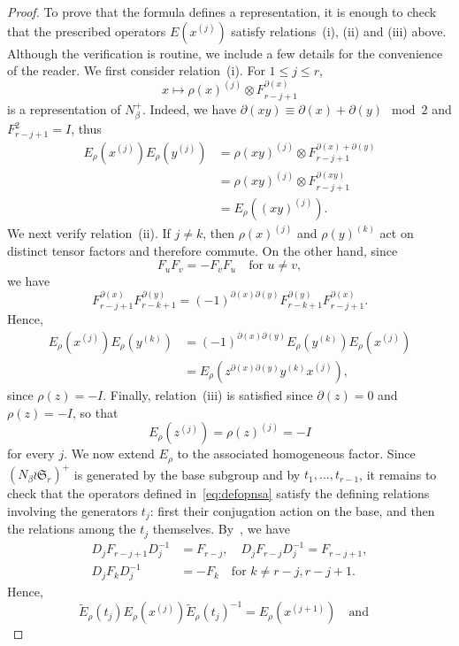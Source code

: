 \documentclass[reqno]{amsart}
\newcommand{\sym}{\mathfrak{S}}
\theoremstyle{definition}
\begin{document}
\begin{proof}
To prove that the formula defines a representation, it is enough to check that
the prescribed operators $E(x^{(j)})$ satisfy relations~(i), (ii) and
(iii) above. Although the verification is routine, we include a few
details for the convenience of the reader. 
We first consider relation~(i). For $1\leq j\leq r$, 
\[
x\longmapsto
\rho(x)^{(j)}\otimes F_{r-j+1}^{\partial(x)}
\]
is a representation of $N_\beta^+$. Indeed, we have
$
\partial(xy)\equiv\partial(x)+\partial(y)\mod 2
$
and $F_{r-j+1}^2=I$, thus
\[
\begin{aligned}
E_\rho(x^{(j)})E_\rho(y^{(j)})
&=
\rho(xy)^{(j)}\otimes
F_{r-j+1}^{\partial(x)+\partial(y)}\\
&=
\rho(xy)^{(j)}\otimes
F_{r-j+1}^{\partial(xy)}\\
&=
E_\rho((xy)^{(j)}).
\end{aligned}
\]
We next verify relation~(ii). If $j\neq k$, then $\rho(x)^{(j)}$ and
$\rho(y)^{(k)}$ act on distinct tensor factors and therefore commute.
On the other hand, since
\[
F_uF_v=-F_vF_u
\quad \text{for }u\neq v,
\]
we have
\[
F_{r-j+1}^{\partial(x)}F_{r-k+1}^{\partial(y)}
=
(-1)^{\partial(x)\partial(y)}
F_{r-k+1}^{\partial(y)}F_{r-j+1}^{\partial(x)}.
\]
Hence,
\[
\begin{aligned}
E_\rho(x^{(j)})E_\rho(y^{(k)})
&=
(-1)^{\partial(x)\partial(y)}
E_\rho(y^{(k)})E_\rho(x^{(j)})\\
&=
E_\rho\!\left(
z^{\partial(x)\partial(y)}y^{(k)}x^{(j)}
\right),
\end{aligned}
\]
since $\rho(z)=-I$.
Finally, relation~(iii) is satisfied since $\partial(z)=0$ and
$\rho(z)=-I$, so that
\[
E_\rho(z^{(j)})=\rho(z)^{(j)}=-I
\]
for every $j$.
We now extend $E_\rho$ to the associated homogeneous factor. Since
$(N_\beta\wr \sym_r)^+$ is generated by the base subgroup and by
$t_1,\ldots,t_{r-1}$, it remains to check that the operators defined
in~\eqref{eq:defopnsa} satisfy the defining relations involving the
generators $t_j$: first their conjugation action on the base, and then the
relations among the $t_j$ themselves. 
By~\cite[Lemma 4.2(5)]{MichlerOlsson}, we have
\begin{align*}
  D_j F_{r-j+1} D_j^{-1} &= F_{r-j},\quad 
  D_j F_{r-j} D_j^{-1}   = F_{r-j+1},\\
  D_j F_k D_j^{-1} &= -F_k \quad \text{for } k \neq r-j, r-j+1.
\end{align*}
Hence,
\[
\widetilde{E}_\rho(t_j)E_\rho(x^{(j)})\widetilde{E}_\rho(t_j)^{-1}
=
E_\rho(x^{(j+1)})
\quad\text{and}\quad
\]
\end{proof}
\end{document}
